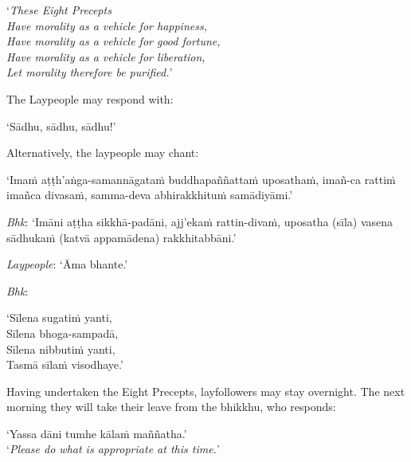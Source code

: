 ‘\emph{These Eight Precepts\\
Have morality as a vehicle for happiness,\\
Have morality as a vehicle for good fortune,\\
Have morality as a vehicle for liberation,\\
Let morality therefore be purified.}’

The Laypeople may respond with:

‘Sādhu, sādhu, sādhu!’

Alternatively, the laypeople may chant:

‘Imaṁ aṭṭh'aṅga-samannāgataṁ buddhapaññattaṁ uposathaṁ, imañ-ca rattiṁ imañca
divasaṁ, samma-deva abhirakkhituṁ samādiyāmi.’

\emph{Bhk}: ‘Imāni aṭṭha sikkhā-padāni, ajj'ekaṁ rattin-divaṁ, uposatha (sīla)
vasena sādhukaṁ (katvā appamādena) rakkhitabbāni.’

\emph{Laypeople}: ‘Āma bhante.’

\emph{Bhk}:

‘Sīlena sugatiṁ yanti,\\
Sīlena bhoga-sampadā,\\
Sīlena nibbutiṁ yanti,\\
Tasmā sīlaṁ visodhaye.’

Having undertaken the Eight Precepts, layfollowers may stay overnight. The next
morning they will take their leave from the bhikkhu, who responds:

‘Yassa dāni tumhe kālaṁ maññatha.’\\
‘\emph{Please do what is appropriate at this time.}’

